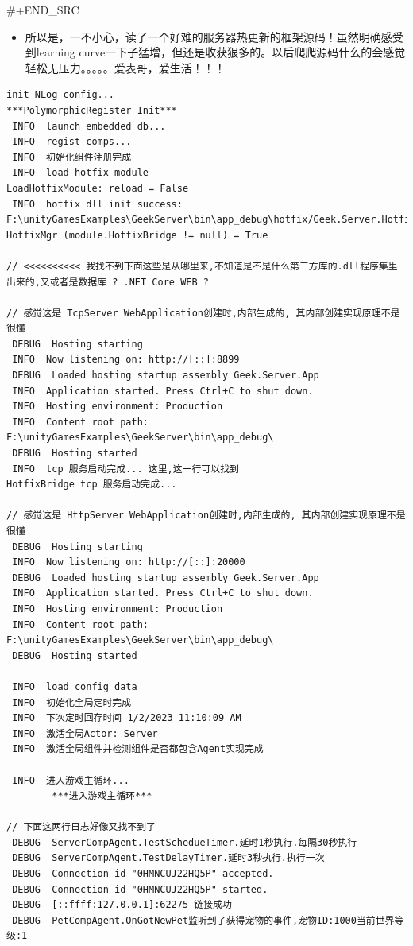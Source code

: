 \documentclass[9pt, b5paper]{article}
\begin{document}
\#+END\_SRC
\begin{itemize}
\item 所以是，一不小心，读了一个好难的服务器热更新的框架源码！虽然明确感受到learning curve一下子猛增，但还是收获狠多的。以后爬爬源码什么的会感觉轻松无压力。。。。。爱表哥，爱生活！！！
\end{itemize}

\begin{verbatim}
init NLog config...
***PolymorphicRegister Init***
 INFO  launch embedded db...
 INFO  regist comps...
 INFO  初始化组件注册完成
 INFO  load hotfix module
LoadHotfixModule: reload = False
 INFO  hotfix dll init success: F:\unityGamesExamples\GeekServer\bin\app_debug\hotfix/Geek.Server.Hotfix.dll
HotfixMgr (module.HotfixBridge != null) = True

// <<<<<<<<<< 我找不到下面这些是从哪里来,不知道是不是什么第三方库的.dll程序集里出来的,又或者是数据库 ? .NET Core WEB ?

// 感觉这是 TcpServer WebApplication创建时,内部生成的, 其内部创建实现原理不是很懂
 DEBUG  Hosting starting
 INFO  Now listening on: http://[::]:8899
 DEBUG  Loaded hosting startup assembly Geek.Server.App
 INFO  Application started. Press Ctrl+C to shut down.
 INFO  Hosting environment: Production
 INFO  Content root path: F:\unityGamesExamples\GeekServer\bin\app_debug\
 DEBUG  Hosting started
 INFO  tcp 服务启动完成... 这里,这一行可以找到
HotfixBridge tcp 服务启动完成...

// 感觉这是 HttpServer WebApplication创建时,内部生成的, 其内部创建实现原理不是很懂
 DEBUG  Hosting starting
 INFO  Now listening on: http://[::]:20000
 DEBUG  Loaded hosting startup assembly Geek.Server.App
 INFO  Application started. Press Ctrl+C to shut down.
 INFO  Hosting environment: Production
 INFO  Content root path: F:\unityGamesExamples\GeekServer\bin\app_debug\
 DEBUG  Hosting started

 INFO  load config data
 INFO  初始化全局定时完成
 INFO  下次定时回存时间 1/2/2023 11:10:09 AM
 INFO  激活全局Actor: Server
 INFO  激活全局组件并检测组件是否都包含Agent实现完成

 INFO  进入游戏主循环...
        ***进入游戏主循环***

// 下面这两行日志好像又找不到了
 DEBUG  ServerCompAgent.TestSchedueTimer.延时1秒执行.每隔30秒执行
 DEBUG  ServerCompAgent.TestDelayTimer.延时3秒执行.执行一次
 DEBUG  Connection id "0HMNCUJ22HQ5P" accepted.
 DEBUG  Connection id "0HMNCUJ22HQ5P" started.
 DEBUG  [::ffff:127.0.0.1]:62275 链接成功
 DEBUG  PetCompAgent.OnGotNewPet监听到了获得宠物的事件,宠物ID:1000当前世界等级:1


\end{verbatim}
\end{document}
